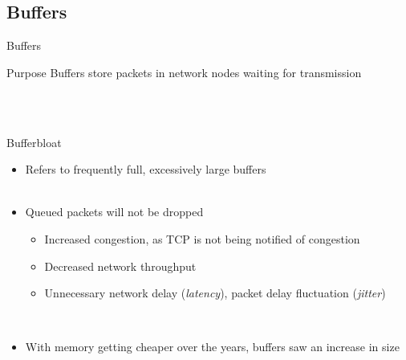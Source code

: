 \documentclass[english,aspectratio=43,t]{beamer}
\begin{document}
\subsection{Buffers}
\label{sec:buffers}
\begin{frame}{Buffers}
~\\
\begin{block}{Purpose}
Buffers store packets in network nodes waiting for transmission
\end{block}
~\\
~\\
\end{frame}

\begin{frame}{Bufferbloat}
\begin{itemize}
\item Refers to frequently full, excessively large buffers
~\\~\\
\item<2-> Queued packets will not be dropped
	\begin{itemize}
	\item<2->[$\Rightarrow$] Increased congestion, as TCP is not being notified of congestion
	\item<2->[$\Rightarrow$] Decreased network throughput
	\item<2->[$\Rightarrow$] Unnecessary network delay (\textit{latency}), packet delay fluctuation (\textit{jitter})
	\end{itemize}
~\\
\item<3-> With memory getting cheaper over the years, buffers saw an increase in size
\end{itemize}
\end{frame}
\end{document}
